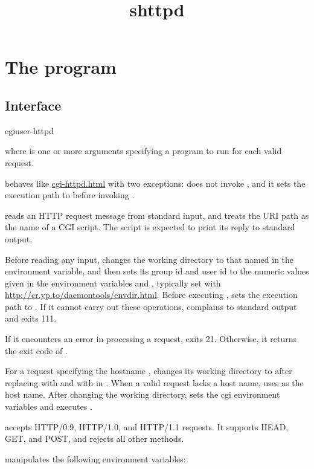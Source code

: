\documentclass{book}
\title{shttpd}
\begin{document}
\section{The  program}

\subsection{Interface}
\begin{code}
  cgiuser-httpd 
\end{code}
where  is one or more arguments specifying a program to run
for each valid request.

 behaves like \href{\cmd{cgi-httpd}}{cgi-httpd.html} with two
exceptions:  does not invoke , and it sets the
execution path to  before invoking .

 reads an HTTP request message from standard input,
and treats the URI path as the name of a CGI script.  The script is
expected to print its reply to standard output.

Before reading any input,  changes the working directory to
that named in the  environment variable, and then sets its group id
and user id to the numeric values given in the environment variables 
and , typically set with
\href{\cmd{envdir}}{http://cr.yp.to/daemontools/envdir.html}.  Before executing
,  sets the execution path to .
If it cannot carry out these operations,  complains to
standard output and exits 111.

If it encounters an error in processing a request, 
exits 21.  Otherwise, it returns the exit code of .

For a request specifying the hostname , 
changes its working directory to  after replacing
  with \cmd{/:} and \cmd{//} with \cmd{/} in
.  When a valid request lacks a host name,
 uses  as the host name.  After changing the
working directory,  sets the cgi environment variables
and executes .

 accepts HTTP/0.9, HTTP/1.0, and HTTP/1.1 requests.  It
supports HEAD, GET, and POST, and rejects all other methods.

 manipulates the following environment variables:
\end{document}
